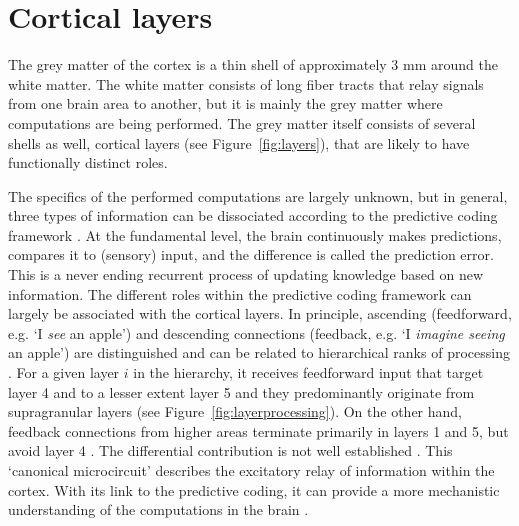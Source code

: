 \section*{Cortical layers}
The grey matter of the cortex is a thin shell of approximately 3 mm \cite{Zilles1990} around the white matter. The white matter consists of long fiber tracts that relay signals from one brain area to another, but it is mainly the grey matter where computations are being performed. The grey matter itself consists of several shells as well, cortical layers (see Figure~\ref{fig:layers}), that are likely to have functionally distinct roles.

The specifics of the performed computations are largely unknown, but in general, three types of information can be dissociated according to the predictive coding framework \cite{Friston2010}. At the fundamental level, the brain continuously makes predictions, compares it to (sensory) input, and the difference is called the prediction error. This is a never ending recurrent process of updating knowledge based on new information. The different roles within the predictive coding framework can largely be associated with the cortical layers. In principle, ascending (feedforward, e.g. `I \emph{see} an apple') and descending connections (feedback, e.g. `I \emph{imagine seeing} an apple') are distinguished \cite{Rockland1979} and can be related to hierarchical ranks of processing \cite{Barone2000}. For a given layer $i$ in the hierarchy, it receives feedforward input that target layer 4 and to a lesser extent layer 5 \cite{Constantinople2013} and they predominantly originate from supragranular layers (see Figure~\ref{fig:layerprocessing}). On the other hand, feedback connections from higher areas terminate primarily in layers 1 and 5, but avoid layer 4 \cite{Anderson2009}. The differential contribution is not well established \cite{Shipp2013}. This `canonical microcircuit' describes the excitatory relay of information within the cortex. With its link to the predictive coding, it can provide a more mechanistic understanding of the computations in the brain \cite{Shipp2016}.


